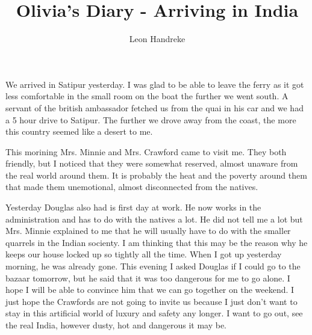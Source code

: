 \documentclass[10pt]{article}
\title{Olivia's Diary - Arriving in India}
\author{Leon Handreke}
\date{}                                           %
\begin{document}
\doublespacing

\maketitle
{}\selectfont

We arrived in Satipur yesterday. I was glad to be able to leave the ferry as it got less comfortable in the small room on the boat the further we went south. A servant of the british ambassador fetched us from the quai in his car and we had a 5 hour drive to Satipur. The further we drove away from the coast, the more this country seemed like a desert to me.

This morining Mrs. Minnie and Mrs. Crawford came to visit me. They both friendly, but I noticed that they were somewhat reserved, almost unaware from the real world around them. It is probably the heat and the poverty around them that made them unemotional, almost disconnected from the natives.

Yesterday Douglas also had is first day at work. He now works in the administration and has to do with the natives a lot. He did not tell me a lot but Mrs. Minnie explained to me that he will usually have to do with the smaller quarrels in the Indian socienty. I am thinking that this may be the reason why he keeps our house locked up so tightly all the time. When I got up yesterday morning, he was already gone. This evening I asked Douglas if I could go to the bazaar tomorrow, but he said that it was too dangerous for me to go alone. I hope I will be able to convince him that we can go together on the weekend. I just hope the Crawfords are not going to invite us because I just don't want to stay in this artificial world of luxury and safety any longer. I want to go out, see the real India, however dusty, hot and dangerous it may be.
\end{document}

